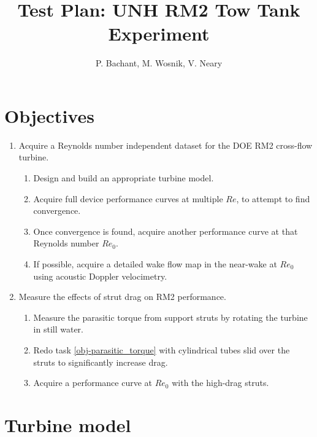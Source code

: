 \documentclass[10pt,a4paper]{article}
\author{P. Bachant, M. Wosnik, V. Neary}
\title{Test Plan: UNH RM2 Tow Tank Experiment}
\begin{document}
\maketitle
\tableofcontents

\section{Objectives}

\begin{enumerate}

	\item Acquire a Reynolds number independent dataset for the DOE RM2 cross-flow
	turbine.

		\begin{enumerate}
			\item Design and build an appropriate turbine model.
		
			\item Acquire full device performance curves at multiple $Re$, to attempt to
			find convergence.
		  
			\item Once convergence is found, acquire another performance curve at that
			Reynolds number $Re_0$.
		
			\item If possible, acquire a detailed wake flow map in the near-wake at
			$Re_0$ using acoustic Doppler velocimetry.
		\end{enumerate}
	
	\item Measure the effects of strut drag on RM2 performance.
	
	\begin{enumerate}
		\item Measure the parasitic torque from support struts by rotating the turbine
		in still water. \label{obj-parasitic_torque}
		
		\item Redo task \ref{obj-parasitic_torque} with cylindrical tubes slid over
		the struts to significantly increase drag.
		
		\item Acquire a performance curve at $Re_0$ with the high-drag struts. 
	\end{enumerate}
	
\end{enumerate}


\section{Turbine model}
\end{document}
